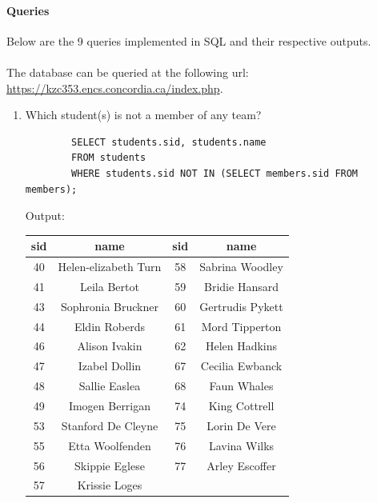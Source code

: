 \documentclass[11pt,letterpaper]{article}
\begin{document}
	\paragraph{Queries} Below are the 9 queries implemented in SQL and their respective outputs.\\
	\\
	The database can be queried at the following url: \url{https://kzc353.encs.concordia.ca/index.php}.
	\begin{enumerate}
		
		\item Which student(s) is not a member of any team?
		\begin{verbatim}
		SELECT students.sid, students.name
		FROM students
		WHERE students.sid NOT IN (SELECT members.sid FROM members);
		\end{verbatim}
		Output:
		\begin{center}
			\begin{tabular}{ | c  c | c  c | }
				\hline
				sid & name & sid & name\\
				\hline
				40 & Helen-elizabeth Turn & 58 & Sabrina Woodley \\
				41 & Leila Bertot & 59 & Bridie Hansard \\
				43 & Sophronia Bruckner & 60 & Gertrudis Pykett \\
				44 & Eldin Roberds & 61 & Mord Tipperton \\
				46 & Alison Ivakin & 62 & Helen Hadkins \\
				47 & Izabel Dollin & 67 & Cecilia Ewbanck \\
				48 & Sallie Easlea & 68 & Faun Whales \\
				49 & Imogen Berrigan & 74 & King Cottrell \\
				53 & Stanford De Cleyne & 75 & Lorin De Vere \\
				55 & Etta Woolfenden & 76 & Lavina Wilks \\
				56 & Skippie Eglese & 77 & Arley Escoffer \\
				57 & Krissie Loges &  & \\
				\hline
			\end{tabular}
		\end{center}
		
		\pagebreak
		

\end{enumerate}
\end{document}
